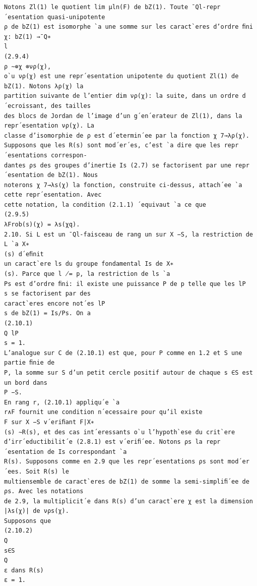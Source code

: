 \documentclass[11pt]{article}
\begin{document}
\begin{Verbatim}[breaklines=true,fontsize=\small]
Notons Zl(1) le quotient lim µln(F) de bZ(1). Toute ¯Ql-repr´esentation quasi-unipotente
ρ de bZ(1) est isomorphe `a une somme sur les caract`eres d’ordre ﬁni χ: bZ(1) →¯Q∗
l
(2.9.4)
ρ ∼⊕χ ⊗νρ(χ),
o`u νρ(χ) est une repr´esentation unipotente du quotient Zl(1) de bZ(1). Notons λρ(χ) la
partition suivante de l’entier dim νρ(χ): la suite, dans un ordre d´ecroissant, des tailles
des blocs de Jordan de l’image d’un g´en´erateur de Zl(1), dans la repr´esentation νρ(χ). La
classe d’isomorphie de ρ est d´etermin´ee par la fonction χ 7→λρ(χ).
Supposons que les R(s) sont mod´er´es, c’est `a dire que les repr´esentations correspon-
dantes ρs des groupes d’inertie Is (2.7) se factorisent par une repr´esentation de bZ(1). Nous
noterons χ 7→λs(χ) la fonction, construite ci-dessus, attach´ee `a cette repr´esentation. Avec
cette notation, la condition (2.1.1) ´equivaut `a ce que
(2.9.5)
λFrob(s)(χ) = λs(χq).
2.10. Si L est un ¯Ql-faisceau de rang un sur X −S, la restriction de L `a X∗
(s) d´eﬁnit
un caract`ere ls du groupe fondamental Is de X∗
(s). Parce que l ̸= p, la restriction de ls `a
Ps est d’ordre ﬁni: il existe une puissance P de p telle que les lP
s se factorisent par des
caract`eres encore not´es lP
s de bZ(1) = Is/Ps. On a
(2.10.1)
Q lP
s = 1.
L’analogue sur C de (2.10.1) est que, pour P comme en 1.2 et S une partie ﬁnie de
P, la somme sur S d’un petit cercle positif autour de chaque s ∈S est un bord dans
P −S.
En rang r, (2.10.1) appliqu´e `a
r∧F fournit une condition n´ecessaire pour qu’il existe
F sur X −S v´eriﬁant F|X∗
(s) ∼R(s), et des cas int´eressants o`u l’hypoth`ese du crit`ere
d’irr´eductibilit´e (2.8.1) est v´eriﬁ´ee. Notons ρs la repr´esentation de Is correspondant `a
R(s). Supposons comme en 2.9 que les repr´esentations ρs sont mod´er´ees. Soit R(s) le
multiensemble de caract`eres de bZ(1) de somme la semi-simpliﬁ´ee de ρs. Avec les notations
de 2.9, la multiplicit´e dans R(s) d’un caract`ere χ est la dimension |λs(χ)| de νρs(χ).
Supposons que
(2.10.2)
Q
s∈S
Q
ε dans R(s)
ε = 1.


\end{Verbatim}
\end{document}
